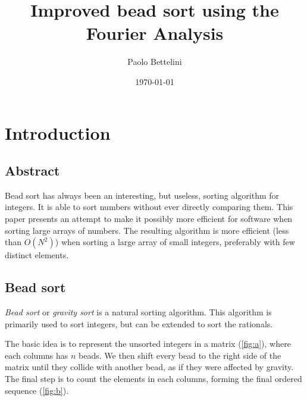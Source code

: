 \documentclass{article}
\title{Improved bead sort using the Fourier Analysis}
\author{Paolo Bettelini}
\date{\today}
\begin{document}
\maketitle

\section{Introduction}

\subsection{Abstract}

Bead sort has always been an interesting, but useless, sorting algorithm
for integers. It is able to sort numbers without ever directly comparing them.
This paper presents an attempt to make it possibly more efficient
for software when sorting large arrays of numbers.
The resulting algorithm is more efficient (less than \(O(N^2)\)) when sorting a large array of small integers,
preferably with few distinct elements.

\subsection{Bead sort}

\textit{Bead sort}\cite{beadsort} or \textit{gravity sort}
is a natural sorting algorithm.
This algorithm is primarily used to sort
integers, but can be extended to sort the rationals.

The basic idea is to represent the unsorted integers
in a matrix (\ref{fig:a}), where each columns has \(n\) beads.
We then shift every bead to the right side of the matrix
until they collide with another bead,
as if they were affected by gravity.
The final step is to count the elements in each columns,
forming the final ordered sequence (\ref{fig:b}).
\end{document}
